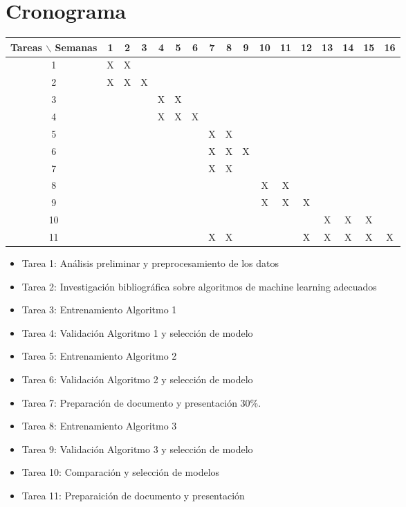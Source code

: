 \documentclass[12pt]{article}
\begin{document}
\section{Cronograma}

\begin{table}[htb]
	\begin{tabular}{|c|cccccccccccccccc| }
	\hline
	Tareas $\backslash$ Semanas & 1 & 2 & 3 & 4 & 5 & 6 & 7 & 8 & 9 & 10 & 11 & 12 & 13 & 14 & 15 & 16  \\
	\hline
	1 & X & X &   &   &   &   &   &  &  &   &   &   &   &   &   &   \\
	2 &  X & X & X &   &  &  &  &   &   &  &  &  &   &  &  &   \\
	3 &   &   &   & X & X  &   &   &  &   &   &   &  &   &   &  &   \\
	4 &  &  &  & X & X & X &  &  &  &  &   &   &   &   &   &   \\
	5 &  &   &   &   &  &   &  X & X  & &   &   &  &   &   &  &   \\
	6 &  &  &   &   &   &   & X  & X & X &   &   &   &   &   &   &   \\
	7 &   &   &   &   &  &   &  X & X  &  &   &   &  &   &   &  &   \\	
	8 &   &  &  &   &  &  &  &   &   & X & X &  &  &  &  &   \\
	9 &   &   &   &  &   &   &   &  &   & X  &  X & X &  &   &  &   \\
	10 &  &  &  &  &  &  &  &  &  & &   &   &  X &  X & X  &   \\
	11 &   &   &   &   &  &   &  X & X  &  &   &   & X &  X & X  & X &  X \\

	\hline
	\end{tabular}
\end{table}
\vspace{1mm}

\begin{itemize}
	\item Tarea 1:  Análisis preliminar y preprocesamiento de los datos
	\item Tarea 2: Investigación bibliográfica sobre algoritmos de machine learning adecuados
	\item Tarea 3: Entrenamiento Algoritmo 1
	\item Tarea 4: Validación Algoritmo  1 y selección de modelo
	\item Tarea 5: Entrenamiento Algoritmo 2
	\item Tarea 6: Validación Algoritmo  2 y selección de modelo
	\item Tarea 7: Preparación de documento y presentación 30\%.
	\item Tarea 8: Entrenamiento Algoritmo 3
	\item Tarea 9: Validación Algoritmo  3 y selección de modelo
	\item Tarea 10: Comparación y selección de modelos 
	\item Tarea 11: Preparaición de documento y presentación
 
\end{itemize}
\end{document}
